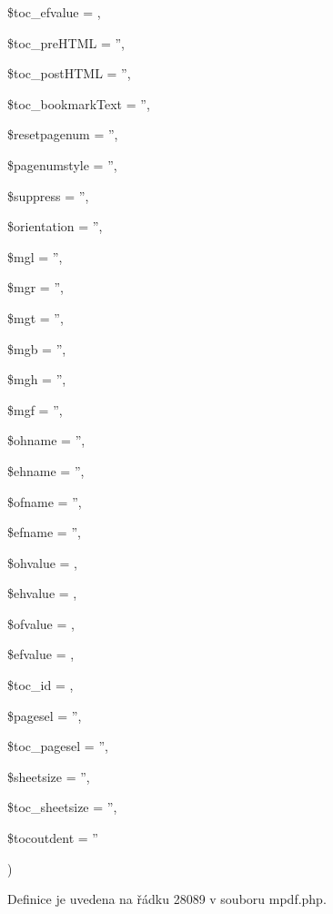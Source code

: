 {{\begin{DoxyParamCaption}
\item[{}]{\$toc\-\_\-efvalue = {}, }
\item[{}]{\$toc\-\_\-pre\-H\-T\-M\-L = {\ttfamily ''}, }
\item[{}]{\$toc\-\_\-post\-H\-T\-M\-L = {\ttfamily ''}, }
\item[{}]{\$toc\-\_\-bookmark\-Text = {\ttfamily ''}, }
\item[{}]{\$resetpagenum = {\ttfamily ''}, }
\item[{}]{\$pagenumstyle = {\ttfamily ''}, }
\item[{}]{\$suppress = {\ttfamily ''}, }
\item[{}]{\$orientation = {\ttfamily ''}, }
\item[{}]{\$mgl = {\ttfamily ''}, }
\item[{}]{\$mgr = {\ttfamily ''}, }
\item[{}]{\$mgt = {\ttfamily ''}, }
\item[{}]{\$mgb = {\ttfamily ''}, }
\item[{}]{\$mgh = {\ttfamily ''}, }
\item[{}]{\$mgf = {\ttfamily ''}, }
\item[{}]{\$ohname = {\ttfamily ''}, }
\item[{}]{\$ehname = {\ttfamily ''}, }
\item[{}]{\$ofname = {\ttfamily ''}, }
\item[{}]{\$efname = {\ttfamily ''}, }
\item[{}]{\$ohvalue = {}, }
\item[{}]{\$ehvalue = {}, }
\item[{}]{\$ofvalue = {}, }
\item[{}]{\$efvalue = {}, }
\item[{}]{\$toc\-\_\-id = {}, }
\item[{}]{\$pagesel = {\ttfamily ''}, }
\item[{}]{\$toc\-\_\-pagesel = {\ttfamily ''}, }
\item[{}]{\$sheetsize = {\ttfamily ''}, }
\item[{}]{\$toc\-\_\-sheetsize = {\ttfamily ''}, }
\item[{}]{\$tocoutdent = {\ttfamily ''}}
\end{DoxyParamCaption}
)}}\label{classm_p_d_f_a391d4b430edd22c1c4a84dde18963fed}


Definice je uvedena na řádku 28089 v souboru mpdf.\-php.



